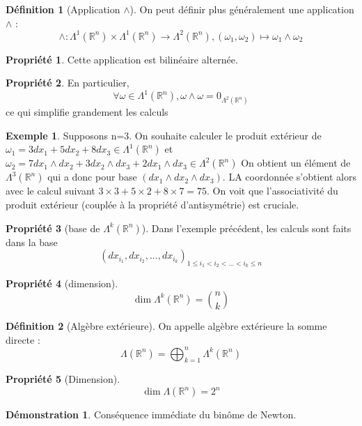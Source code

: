 \documentclass{article}
\newcommand{\R}{\mathbb{R}} %
\theoremstyle{definition} %
\newtheorem{defi}{Définition}
\newtheorem{ex}{Exemple}
\newtheorem{dem}{Démonstration}
\newtheorem{propri}{Propriété}
\newcommand{\lam}[1]{\Lambda^{#1} (\R^n)}
\newcommand{\1}{\mathbb{1}} %
\begin{document}
\begin{defi}[Application $\wedge$]
On peut définir plus généralement une application $\wedge$ :
$$\wedge : \Lambda^1(\R^n) \times \Lambda^1(\R^n) \to \Lambda^2(\R^n) , (\omega_1,\omega_2) \mapsto \omega_1 \wedge \omega_2$$
\end{defi}
\begin{propri}
Cette application est bilinéaire alternée.
\end{propri}
\begin{propri}
En particulier,
$$\forall \omega \in \lam{1}, \omega \wedge \omega = 0_{\lam{2}}$$
ce qui simplifie grandement les calculs
\end{propri}
\begin{ex}
Supposons n=3.
On souhaite calculer le produit extérieur de $\omega_1=3dx_1+5dx_2+8dx_3 \in \lam{1}$ et $\omega_2=7dx_1 \wedge dx_2 +3dx_2 \wedge dx_3 +2dx_1 \wedge dx_3 \in \lam{2}$
On obtient un élément de $\lam{3}$ qui a donc pour base $(dx_1 \wedge dx_2 \wedge dx_3)$. LA coordonnée s'obtient alors avec le calcul suivant
$3 \times 3 + 5 \times 2 + 8 \times 7=75$.
On voit que l'associativité du produit extérieur (couplée à la propriété d'antisymétrie) est cruciale.
\end{ex}
\begin{propri}[base de $\lam{k}$]
Dans l'exemple précédent, les calculs sont faits dans la base
$$(dx_{i_1},dx_{i_2},...,dx_{i_k})_{1 \leq i_1 < i_2 < ... < i_k \leq n}$$
\end{propri}

\begin{propri}[dimension]
$$\dim \lam{k} = \binom{n}{k}$$
\end{propri}

\begin{defi}[Algèbre extérieure]
On appelle algèbre extérieure la somme directe :
$$\Lambda(\R^n) = \bigoplus_{k=1}^{n} \lam{k}$$
\end{defi}
\begin{propri}[Dimension]
$$\dim \Lambda(\R^n) = 2^n$$
\end{propri}

\begin{dem}
Conséquence immédiate du binôme de Newton.
\end{dem}
\end{document}

